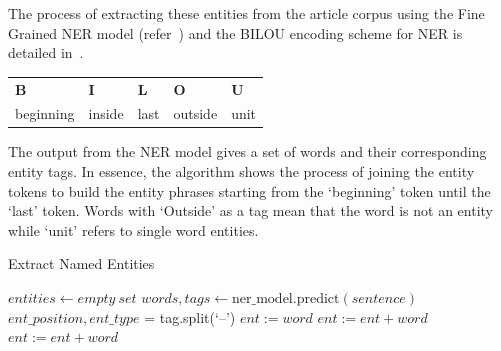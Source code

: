 The process of extracting these entities from the article corpus using the Fine Grained NER model (refer~) and the BILOU encoding scheme for NER is detailed in~.

\begin{tabularx}{\textwidth}{X X X X X} 
  \textbf{B} & \textbf{I}  & \textbf{L}  & \textbf{O}  & \textbf{U} \\
  beginning & inside & last & outside &  unit \\
  \end{tabularx}

The output from the NER model gives a set of words and their corresponding entity tags. In essence, the algorithm shows the process of joining the entity tokens to build the entity phrases starting from the `beginning' token until the `last' token. Words with `Outside' as a tag mean that the word is not an entity while `unit' refers to single word entities.  

\begin{algorithm}[H]
  \caption{Extract Named Entities}
  \label{alg:named_ents}
  \begin{algorithmic}   
  \State $entities \leftarrow empty \ set$
  \State $words, tags \leftarrow \text{ner\_model.predict}(sentence)$
        \EndIf
    \State $ent\_position, ent\_type$ = tag.split(`--')
    \Else
      \State $ent := word$
      \State  $ent := ent + word$
      \State  $ent := ent + word$
      \EndIf
    \EndIf
  \EndFor
\end{algorithmic}
\end{algorithm}

